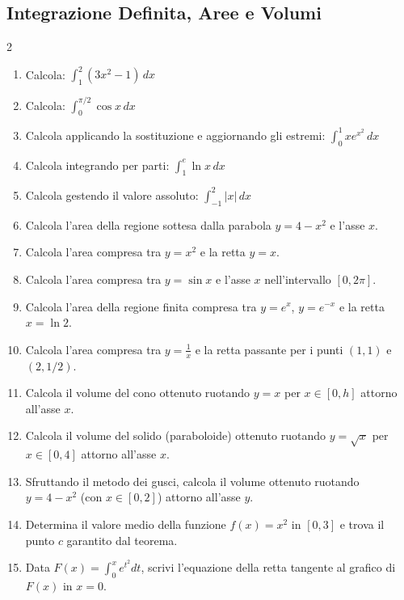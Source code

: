 \subsection{Integrazione Definita, Aree e Volumi}
\begin{multicols}{2}
\begin{enumerate}
    \item {} Calcola: $\int_1^2 (3x^2 - 1) \, dx$
    \item {} Calcola: $\int_0^{\pi/2} \cos x \, dx$
    \item {} Calcola applicando la sostituzione e aggiornando gli estremi: $\int_0^1 x e^{x^2} \, dx$
    \item {} Calcola integrando per parti: $\int_1^e \ln x \, dx$
    \item {} Calcola gestendo il valore assoluto: $\int_{-1}^2 |x| \, dx$
    
    \item {} Calcola l'area della regione sottesa dalla parabola $y=4-x^2$ e l'asse $x$.
    \item {} Calcola l'area compresa tra $y = x^2$ e la retta $y = x$.
    \item {} Calcola l'area compresa tra $y = \sin x$ e l'asse $x$ nell'intervallo $[0, 2\pi]$.
    \item {} Calcola l'area della regione finita compresa tra $y = e^x$, $y = e^{-x}$ e la retta $x = \ln 2$.
    \item {} Calcola l'area compresa tra $y = \frac{1}{x}$ e la retta passante per i punti $(1,1)$ e $(2, 1/2)$.
    
    \item {} Calcola il volume del cono ottenuto ruotando $y = x$ per $x \in [0, h]$ attorno all'asse $x$.
    \item {} Calcola il volume del solido (paraboloide) ottenuto ruotando $y = \sqrt{x}$ per $x \in [0, 4]$ attorno all'asse $x$.
    \item {} Sfruttando il metodo dei gusci, calcola il volume ottenuto ruotando $y = 4-x^2$ (con $x \in [0,2]$) attorno all'asse $y$.
    \item {} Determina il valore medio della funzione $f(x) = x^2$ in $[0,3]$ e trova il punto $c$ garantito dal teorema.
    \item {} Data $F(x) = \int_0^x e^{t^2} dt$, scrivi l'equazione della retta tangente al grafico di $F(x)$ in $x=0$.
\end{enumerate}
\end{multicols}

